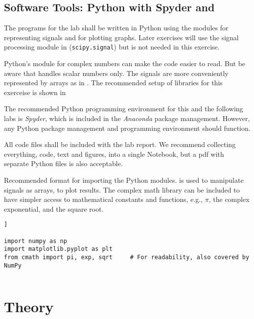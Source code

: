 \subsection{Software Tools: Python with Spyder and \jupyterlab}
The programs for the lab shall be written in Python using the modules \numpy for representing signals and \matplotlib for plotting graphs. Later exercises will use the signal processing module in \scipy (\texttt{scipy.signal}) but \scipy is not needed in this exercise.

Python's module for complex numbers \cmath can make the code easier to read. But be aware that \cmath handles scalar numbers only. The signals are more conveniently represented by arrays as in \numpy.
The recommended setup of libraries for this exerceise is shown in 

The recommended Python programming environment for this and the following labs is \emph{Spyder}\cite{raybaut_spyder_2024}, which is included in the \emph{Anaconda}\cite{noauthor_anaconda_2024} package management. However, any Python package management and programming environment should function.

All code files shall be included with the lab report. We recommend collecting everything, code, text and figures, into a single \jupyterlab Notebook\cite{project_jupyter_jupyter_nodate}, but a pdf with separate Python files is also acceptable.


\begin{table}[t!]
\caption{Recommended format for importing the Python modules. \numpy is used to manipulate signals as arrays, \matplotlib to plot results.
The complex math library \cmath can be included to have simpler access to mathematical constants and functions, e.g., $\pi$, the complex exponential, and the square root.}
\label{tab:import-libraries}
\begin{lstlisting}[style=pythonstyle]]
		
import numpy as np
import matplotlib.pyplot as plt
from cmath import pi, exp, sqrt     # For readability, also covered by NumPy
		
\end{lstlisting}
\end{table}


\section{Theory}


